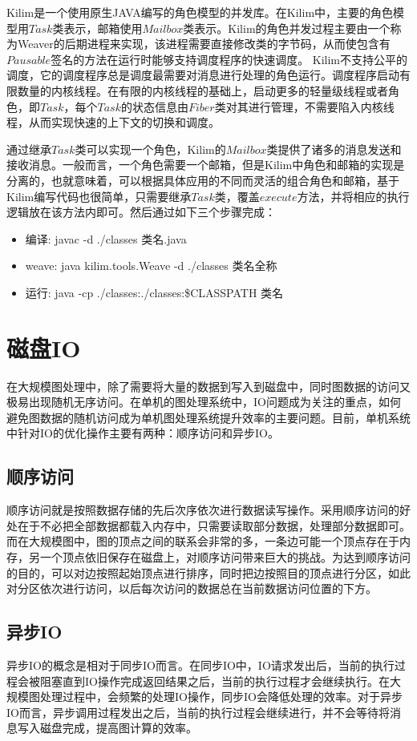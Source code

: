 Kilim是一个使用原生JAVA编写的角色模型的并发库。在Kilim中，主要的角色模型用$Task$类表示，邮箱使用$Mailbox$类表示。Kilim的角色并发过程主要由一个称为Weaver的后期进程来实现，该进程需要直接修改类的字节码，从而使包含有$Pausable$签名的方法在运行时能够支持调度程序的快速调度。
Kilim不支持公平的调度，它的调度程序总是调度最需要对消息进行处理的角色运行。调度程序启动有限数量的内核线程。在有限的内核线程的基础上，启动更多的轻量级线程或者角色，即$Task$，每个$Task$的状态信息由$Fiber$类对其进行管理，不需要陷入内核线程，从而实现快速的上下文的切换和调度。

通过继承$Task$类可以实现一个角色，Kilim的$Mailbox$类提供了诸多的消息发送和接收消息。一般而言，一个角色需要一个邮箱，但是Kilim中角色和邮箱的实现是分离的，也就意味着，可以根据具体应用的不同而灵活的组合角色和邮箱，基于Kilim编写代码也很简单，只需要继承$Task$类，覆盖$execute$方法，并将相应的执行逻辑放在该方法内即可。然后通过如下三个步骤完成：

\begin{itemize}
\item  编译: javac -d ./classes 类名.java
\item weave:   java kilim.tools.Weave -d ./classes 类名全称
\item 运行:     java -cp ./classes:./classes:\$CLASSPATH  类名
\end{itemize}

\section{磁盘IO}
在大规模图处理中，除了需要将大量的数据到写入到磁盘中，同时图数据的访问又极易出现随机无序访问。在单机的图处理系统中，IO问题成为关注的重点，如何避免图数据的随机访问成为单机图处理系统提升效率的主要问题。目前，单机系统中针对IO的优化操作主要有两种：顺序访问和异步IO。

\subsection{顺序访问}
顺序访问就是按照数据存储的先后次序依次进行数据读写操作。采用顺序访问的好处在于不必把全部数据都载入内存中，只需要读取部分数据，处理部分数据即可。而在大规模图中，图的顶点之间的联系会非常的多，一条边可能一个顶点存在于内存，另一个顶点依旧保存在磁盘上，对顺序访问带来巨大的挑战。为达到顺序访问的目的，可以对边按照起始顶点进行排序，同时把边按照目的顶点进行分区，如此对分区依次进行访问，以后每次访问的数据总在当前数据访问位置的下方。
\subsection{异步IO}
异步IO的概念是相对于同步IO而言。在同步IO中，IO请求发出后，当前的执行过程会被阻塞直到IO操作完成返回结果之后，当前的执行过程才会继续执行。在大规模图处理过程中，会频繁的处理IO操作，同步IO会降低处理的效率。对于异步IO而言，异步调用过程发出之后，当前的执行过程会继续进行，并不会等待将消息写入磁盘完成，提高图计算的效率。

